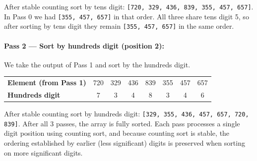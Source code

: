 \documentclass[12pt]{article}
\begin{document}
\noindent After stable counting sort by tens digit: \texttt{[720, 329, 436, 839, 355, 457, 657]}. In Pass 0 we had \texttt{[355, 457, 657]} in that order. All three share tens digit 5, so after sorting by tens digit they remain \texttt{[355, 457, 657]} in the same order.

\paragraph{Pass 2 — Sort by hundreds digit (position 2):}

We take the output of Pass 1 and sort by the hundreds digit.

\begin{table}[h]
\centering
\renewcommand{\arraystretch}{1.2}
\begin{tabular}{@{}lccccccc@{}}
\toprule
\textbf{Element (from Pass 1)} & 720 & 329 & 436 & 839 & 355 & 457 & 657 \\
\textbf{Hundreds digit}        & 7   & 3   & 4   & 8   & 3   & 4   & 6   \\
\bottomrule
\end{tabular}
\end{table}

\noindent After stable counting sort by hundreds digit: \texttt{[329, 355, 436, 457, 657, 720, 839]}. After all 3 passes, the array is fully sorted. Each pass processes a single digit position using counting sort, and because counting sort is stable, the ordering established by earlier (less significant) digits is preserved when sorting on more significant digits.\\





\end{document}
